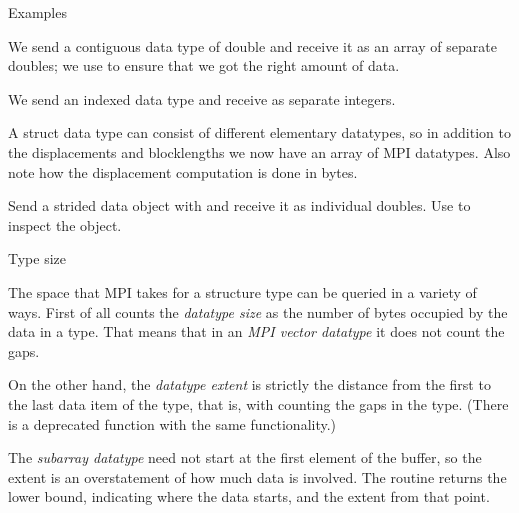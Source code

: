  {Examples}


We send a contiguous data type of double and receive it as an array of
separate doubles; we use  to ensure that
we got the right amount of data.
%
%


We send an indexed data type and receive as separate integers.
%
%
%


A struct data type can consist of different elementary datatypes, so
in addition to the displacements and blocklengths we now have an array
of MPI datatypes. Also note how the displacement computation is done
in bytes.
%


Send a strided data object with  and receive it as
individual doubles. Use  to inspect the
 object.
%
%
%

 {Type size}

The space that MPI takes for a structure type can be queried in a
variety of ways. First of all  counts the
\emph{datatype size} as the 
number of bytes occupied by the data in a type. That means that in an
\emph{MPI vector datatype} it does not
count the gaps.
%
%

On the other hand, the \emph{datatype
  extent} is strictly the distance from the
first to the last data item of the type, that is, with counting the
gaps in the type.
%
%
%
(There is a deprecated function  with the same
functionality.)

The \emph{subarray datatype} need not
start at the first element of the buffer, so the extent is an
overstatement of how much data is involved. The routine
 returns the lower bound,
indicating where the data starts, and the extent from that point.
%


